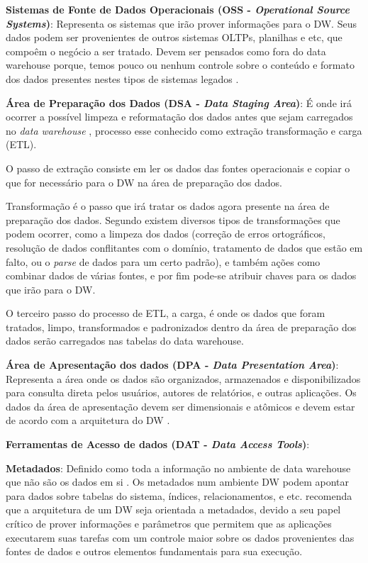 \textbf{Sistemas de Fonte de Dados Operacionais (OSS - \textit{Operational Source Systems})}:
Representa os sistemas que irão prover informações para o DW. Seus dados podem ser provenientes de outros sistemas OLTPs, planilhas e etc, que compoêm o negócio a ser tratado. Devem ser pensados como fora do data warehouse porque, temos pouco ou nenhum controle sobre o conteúdo e formato dos dados presentes nestes tipos de sistemas legados \cite{Kimball2002}.


\textbf{Área de Preparação dos Dados (DSA - \textit{Data Staging Area})}:
É onde irá ocorrer a possível limpeza e reformatação dos dados antes que sejam carregados no \textit{data warehouse} \cite{elmasri_sistemas_2011}, processo esse conhecido como extração transformação e carga (ETL).

O passo de extração consiste em ler os dados das 
fontes operacionais
e copiar o que for necessário para o DW na área de preparação dos dados.

Transformação é o passo que irá tratar os dados agora presente na área de preparação dos dados. Segundo  
existem diversos tipos de transformações que podem ocorrer, como a limpeza dos dados (correção de erros ortográficos, resolução de dados conflitantes com o domínio, tratamento de dados que estão em falto, ou o 
\textit{parse}
de dados para um certo padrão), e também ações como combinar dados de várias fontes, e por fim pode-se atribuir chaves para os dados que irão para o DW.

O terceiro passo do processo de ETL, a carga, é onde os dados que foram tratados, limpo, transformados e padronizados dentro da área de preparação dos dados serão carregados nas tabelas do data warehouse.

\textbf{Área de Apresentação dos dados (DPA - \textit{Data Presentation Area})}:
Representa a área onde os dados são organizados, armazenados e disponibilizados para consulta direta pelos usuários, autores de relatórios, e outras aplicações. Os dados da área de apresentação devem ser dimensionais e atômicos e devem estar de acordo com a arquitetura do DW \cite{Kimball2002}.


\textbf{Ferramentas de Acesso de dados (DAT - \textit{Data Access Tools})}:

\textbf{Metadados}: Definido como toda a informação no ambiente de data warehouse que não são os dados em si \cite{Kimball2002}. Os metadados num ambiente DW podem apontar para dados sobre tabelas do sistema, índices, relacionamentos, e etc.  recomenda que a arquitetura de um DW seja orientada a metadados, devido a seu papel crítico de prover informações e parâmetros que permitem que as aplicações executarem suas tarefas com um controle maior sobre os dados provenientes das fontes de dados e outros elementos fundamentais para sua execução.


